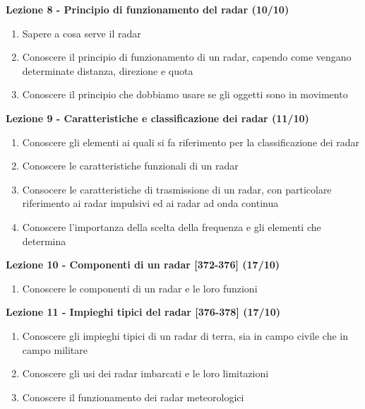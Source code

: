 \documentclass{article}
\begin{document}
	\begin{center}
	\textbf{Lezione 8 - Principio di funzionamento del radar (10/10)}
	\begin{enumerate}
	\item Sapere a cosa serve il radar
	\item Conoscere il principio di funzionamento di un radar, capendo come vengano determinate distanza, direzione e quota
	\item Conoscere il principio che dobbiamo usare se gli oggetti sono in movimento
	\end{enumerate}
	\end{center}
	
	\begin{center}
	\textbf{Lezione 9 - Caratteristiche e classificazione dei radar (11/10)}
	\begin{enumerate}
	\item Conoscere gli elementi ai quali si fa riferimento per la classificazione dei radar
	\item Conoscere le caratteristiche funzionali di un radar
	\item Consocere le caratteristiche di trasmissione di un radar, con particolare riferimento ai radar impulsivi ed ai radar ad onda continua
	\item Conoscere l'importanza della scelta della frequenza e gli elementi che determina
	\end{enumerate}
	\end{center}
	
	\begin{center}
	\textbf{Lezione 10 - Componenti di un radar [372-376] (17/10)}
	\begin{enumerate}
	\item Conoscere le componenti di un radar e le loro funzioni
	\end{enumerate}
	\end{center}
	
	\begin{center}
	\textbf{Lezione 11 - Impieghi tipici del radar [376-378] (17/10)}
	\begin{enumerate}
	\item Conoscere gli impieghi tipici di un radar di terra, sia in campo civile che in campo militare
	\item Conoscere gli usi dei radar imbarcati e le loro limitazioni
	\item Conoscere il funzionamento dei radar meteorologici
	\end{enumerate}
	\end{center}
	
\end{document}
